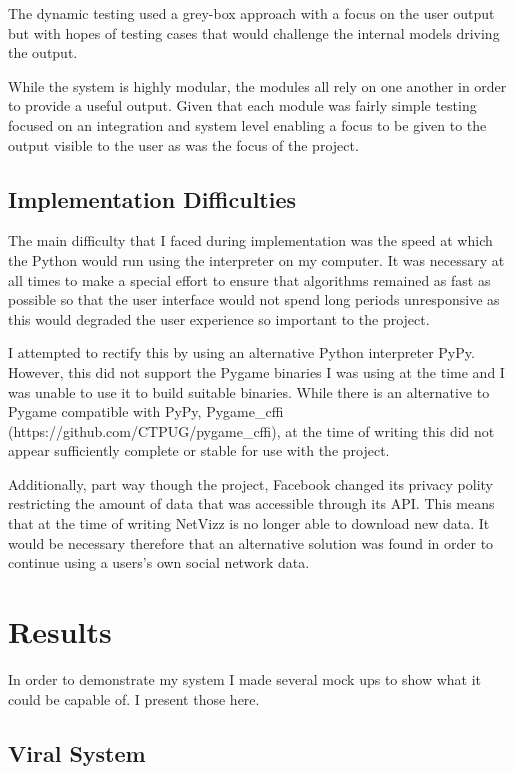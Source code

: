 \documentclass[12pt,a4paper]{article}
\begin{document}
The dynamic testing used a grey-box approach with a focus on the user output but with hopes of testing cases that would challenge the internal models driving the output.

While the system is highly modular, the modules all rely on one another in order to provide a useful output. Given that each module was fairly simple testing focused on an integration and system level enabling a focus to be given to the output visible to the user as was the focus of the project.

\subsection{Implementation Difficulties}

The main difficulty that I faced during implementation was the speed at which the Python would run using the interpreter on my computer. It was necessary at all times to make a special effort to ensure that algorithms remained as fast as possible so that the user interface would not spend long periods unresponsive as this would degraded the user experience so important to the project.

I attempted to rectify this by using an alternative Python interpreter PyPy. However, this did not support the Pygame binaries I was using at the time and I was unable to use it to build suitable binaries. While there is an alternative to Pygame compatible with PyPy, Pygame\_cffi (https://github.com/CTPUG/pygame\_cffi), at the time of writing this did not appear sufficiently complete or stable for use with the project.

Additionally, part way though the project, Facebook changed its privacy polity restricting the amount of data that was accessible through its API. This means that at the time of writing NetVizz is no longer able to download new data. It would be necessary therefore that an alternative solution was found in order to continue using a users's own social network data.

\section{Results}

In order to demonstrate my system I made several mock ups to show what it could be capable of. I present those here.

\subsection{Viral System}
\end{document}
